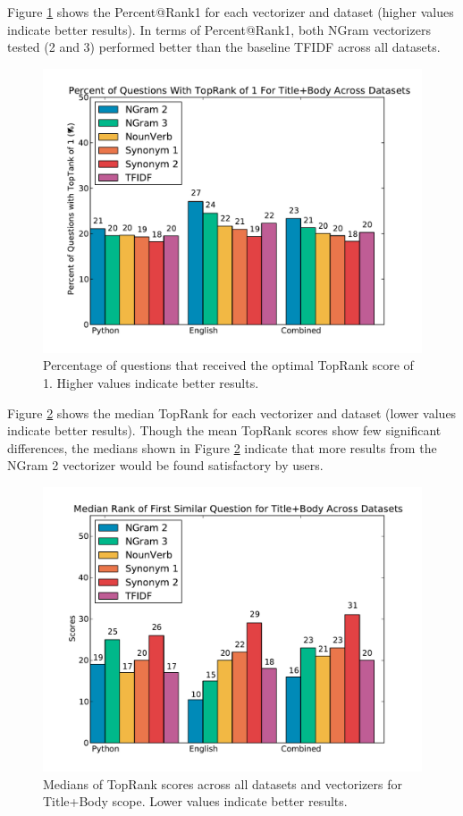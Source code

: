 \documentclass{acm_proc_article-sp}
\begin{document}
	
Figure \ref{fig:allpercent} shows the Percent@Rank1 for each vectorizer and dataset (higher values indicate better results). In terms of Percent@Rank1, both NGram vectorizers tested (2 and 3) performed better than the baseline TFIDF across all datasets. 

\begin{figure}[h]
\centering
\includegraphics[width=1\columnwidth]{images/all-percent@rank1-by-dataset_plot.pdf}
\caption{Percentage of questions that received the optimal TopRank score of 1. Higher values indicate better results.}
\label{fig:allpercent}
\end{figure}
	
Figure \ref{fig:allmedians} shows the median TopRank for each vectorizer and dataset (lower values indicate better results). Though the mean TopRank scores show few significant differences, the medians shown in Figure \ref{fig:allmedians} indicate that more results from the NGram 2 vectorizer would be found satisfactory by users.

\begin{figure}[h]
\centering
\includegraphics[width=1\columnwidth]{images/all-median-topRanks-by-dataset_plot.pdf}
\caption{Medians of TopRank scores across all datasets and vectorizers for Title+Body scope. Lower values indicate better results.}
\label{fig:allmedians}
\end{figure}
\end{document}
